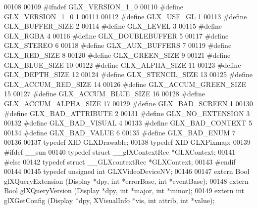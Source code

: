 \begin{DoxyCode}
00108 
00109 \textcolor{preprocessor}{#ifndef GLX\_VERSION\_1\_0}
00110 \textcolor{preprocessor}{#define GLX\_VERSION\_1\_0 1}
00111 
00112 \textcolor{preprocessor}{#define GLX\_USE\_GL 1}
00113 \textcolor{preprocessor}{#define GLX\_BUFFER\_SIZE 2}
00114 \textcolor{preprocessor}{#define GLX\_LEVEL 3}
00115 \textcolor{preprocessor}{#define GLX\_RGBA 4}
00116 \textcolor{preprocessor}{#define GLX\_DOUBLEBUFFER 5}
00117 \textcolor{preprocessor}{#define GLX\_STEREO 6}
00118 \textcolor{preprocessor}{#define GLX\_AUX\_BUFFERS 7}
00119 \textcolor{preprocessor}{#define GLX\_RED\_SIZE 8}
00120 \textcolor{preprocessor}{#define GLX\_GREEN\_SIZE 9}
00121 \textcolor{preprocessor}{#define GLX\_BLUE\_SIZE 10}
00122 \textcolor{preprocessor}{#define GLX\_ALPHA\_SIZE 11}
00123 \textcolor{preprocessor}{#define GLX\_DEPTH\_SIZE 12}
00124 \textcolor{preprocessor}{#define GLX\_STENCIL\_SIZE 13}
00125 \textcolor{preprocessor}{#define GLX\_ACCUM\_RED\_SIZE 14}
00126 \textcolor{preprocessor}{#define GLX\_ACCUM\_GREEN\_SIZE 15}
00127 \textcolor{preprocessor}{#define GLX\_ACCUM\_BLUE\_SIZE 16}
00128 \textcolor{preprocessor}{#define GLX\_ACCUM\_ALPHA\_SIZE 17}
00129 \textcolor{preprocessor}{#define GLX\_BAD\_SCREEN 1}
00130 \textcolor{preprocessor}{#define GLX\_BAD\_ATTRIBUTE 2}
00131 \textcolor{preprocessor}{#define GLX\_NO\_EXTENSION 3}
00132 \textcolor{preprocessor}{#define GLX\_BAD\_VISUAL 4}
00133 \textcolor{preprocessor}{#define GLX\_BAD\_CONTEXT 5}
00134 \textcolor{preprocessor}{#define GLX\_BAD\_VALUE 6}
00135 \textcolor{preprocessor}{#define GLX\_BAD\_ENUM 7}
00136 
00137 \textcolor{keyword}{typedef} XID GLXDrawable;
00138 \textcolor{keyword}{typedef} XID GLXPixmap;
00139 \textcolor{preprocessor}{#ifdef \_\_sun}
00140 \textcolor{keyword}{typedef} \textcolor{keyword}{struct }\_\_glXContextRec *GLXContext;
00141 \textcolor{preprocessor}{#else}
00142 \textcolor{keyword}{typedef} \textcolor{keyword}{struct }\_\_GLXcontextRec *GLXContext;
00143 \textcolor{preprocessor}{#endif}
00144 
00145 \textcolor{keyword}{typedef} \textcolor{keywordtype}{unsigned} \textcolor{keywordtype}{int} GLXVideoDeviceNV; 
00146 
00147 \textcolor{keyword}{extern} Bool glXQueryExtension (Display *dpy, \textcolor{keywordtype}{int} *errorBase, \textcolor{keywordtype}{int} *eventBase);
00148 \textcolor{keyword}{extern} Bool glXQueryVersion (Display *dpy, \textcolor{keywordtype}{int} *major, \textcolor{keywordtype}{int} *minor);
00149 \textcolor{keyword}{extern} \textcolor{keywordtype}{int} glXGetConfig (Display *dpy, XVisualInfo *vis, \textcolor{keywordtype}{int} attrib, \textcolor{keywordtype}{int} *value);

\end{DoxyCode}
